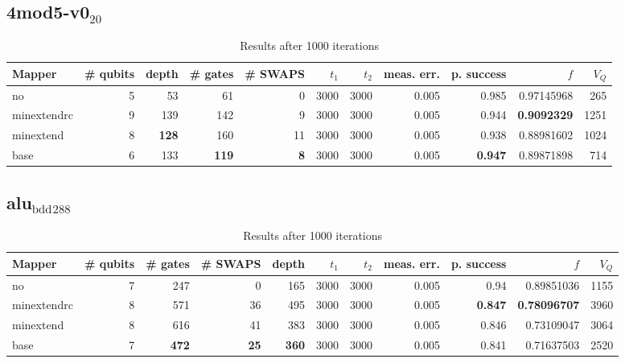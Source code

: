 \documentclass[11pt]{article}
\begin{document}
\subsection{4mod5-v0\(_{\text{20}}\)}
\label{sec:org8fce746}
\begin{table}[H]
\caption{\label{tab:org08d97a0}
Results after 1000 iterations}
\centering
\small
\begin{tabular}{lrrrrrrrrrr}
\hline
Mapper & \# qubits & depth & \# gates & \# SWAPS & \(t_1\) & \(t_2\) & meas. err. & p. success & \(f\) & \(V_Q\)\\
\hline
no & 5 & 53 & 61 & 0 & 3000 & 3000 & 0.005 & 0.985 & 0.97145968 & 265\\
\hline
minextendrc & 9 & 139 & 142 & 9 & 3000 & 3000 & 0.005 & 0.944 & \textbf{0.9092329} & 1251\\
minextend & 8 & \textbf{128} & 160 & 11 & 3000 & 3000 & 0.005 & 0.938 & 0.88981602 & 1024\\
base & 6 & 133 & \textbf{119} & \textbf{8} & 3000 & 3000 & 0.005 & \textbf{0.947} & 0.89871898 & 714\\
\hline
\end{tabular}
\end{table}

\subsection{alu\(_{\text{bdd}}\)\(_{\text{288}}\)}
\label{sec:orgba0dd67}

\begin{table}[H]
\caption{\label{tab:org39b9b8a}
Results after 1000 iterations}
\centering
\small
\begin{tabular}{lrrrrrrrrrr}
\hline
Mapper & \# qubits & \# gates & \# SWAPS & depth & \(t_1\) & \(t_2\) & meas. err. & p. success & \(f\) & \(V_Q\)\\
\hline
no & 7 & 247 & 0 & 165 & 3000 & 3000 & 0.005 & 0.94 & 0.89851036 & 1155\\
\hline
minextendrc & 8 & 571 & 36 & 495 & 3000 & 3000 & 0.005 & \textbf{0.847} & \textbf{0.78096707} & 3960\\
minextend & 8 & 616 & 41 & 383 & 3000 & 3000 & 0.005 & 0.846 & 0.73109047 & 3064\\
base & 7 & \textbf{472} & \textbf{25} & \textbf{360} & 3000 & 3000 & 0.005 & 0.841 & 0.71637503 & 2520\\
\hline
\end{tabular}
\end{table}
\end{document}
